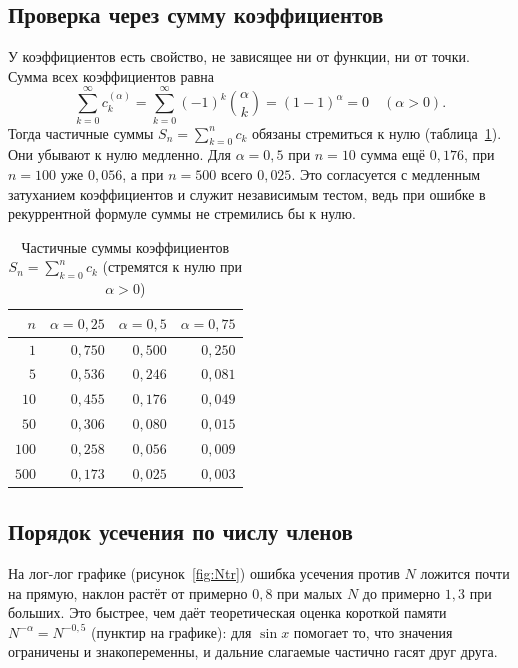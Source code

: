 \documentclass[14pt,a4paper]{extarticle}
\begin{document}
\subsection{Проверка через сумму коэффициентов}

У коэффициентов есть свойство, не зависящее ни от функции, ни от точки. Сумма всех коэффициентов равна
\begin{equation}
\sum_{k=0}^{\infty}c_k^{(\alpha)}=\sum_{k=0}^{\infty}(-1)^k\binom{\alpha}{k}=(1-1)^{\alpha}=0\quad(\alpha>0).
\end{equation}
Тогда частичные суммы $S_n=\sum_{k=0}^{n}c_k$ обязаны стремиться к нулю (таблица~\ref{tab:sums}). Они убывают к нулю медленно. Для $\alpha=0{,}5$ при $n=10$ сумма ещё $0{,}176$, при $n=100$ уже $0{,}056$, а при $n=500$ всего $0{,}025$. Это согласуется с медленным затуханием коэффициентов и служит независимым тестом, ведь при ошибке в рекуррентной формуле суммы не стремились бы к нулю.

\begin{table}[htbp]
\centering
\caption{Частичные суммы коэффициентов $S_n=\sum_{k=0}^{n}c_k$ (стремятся к нулю при $\alpha>0$)}
\label{tab:sums}
\begin{tabular}{|r|r|r|r|}
\hline
$n$ & $\alpha=0{,}25$ & $\alpha=0{,}5$ & $\alpha=0{,}75$ \\
\hline
$1$   & $0{,}750$ & $0{,}500$ & $0{,}250$ \\
\hline
$5$   & $0{,}536$ & $0{,}246$ & $0{,}081$ \\
\hline
$10$  & $0{,}455$ & $0{,}176$ & $0{,}049$ \\
\hline
$50$  & $0{,}306$ & $0{,}080$ & $0{,}015$ \\
\hline
$100$ & $0{,}258$ & $0{,}056$ & $0{,}009$ \\
\hline
$500$ & $0{,}173$ & $0{,}025$ & $0{,}003$ \\
\hline
\end{tabular}
\end{table}

\subsection{Порядок усечения по числу членов}

На лог-лог графике (рисунок~\ref{fig:Ntr}) ошибка усечения против $N$ ложится почти на прямую, наклон растёт от примерно $0{,}8$ при малых $N$ до примерно $1{,}3$ при больших. Это быстрее, чем даёт теоретическая оценка короткой памяти $N^{-\alpha}=N^{-0{,}5}$ (пунктир на графике): для $\sin x$ помогает то, что значения ограничены и знакопеременны, и дальние слагаемые частично гасят друг друга.
\end{document}
